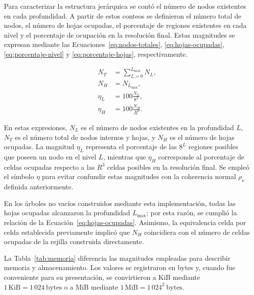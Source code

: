 Para caracterizar la estructura jerárquica se contó el número de nodos
existentes en cada profundidad. A partir de estos conteos se definieron
el número total de nodos, el número de hojas ocupadas, el porcentaje
de regiones existentes en cada nivel y el porcentaje de ocupación en
la resolución final. Estas magnitudes se expresan mediante las
Ecuaciones~\eqref{eq:nodos-totales},
\eqref{eq:hojas-ocupadas},
\eqref{eq:porcentaje-nivel} y
\eqref{eq:porcentaje-hojas}, respectivamente.

\begin{subequations}\label{eq:metricas-estructurales}
\begin{align}
N_T
&=
\sum_{L=0}^{L_{\max}}N_L,
\label{eq:nodos-totales}\\
N_H
&=
N_{L_{\max}},
\label{eq:hojas-ocupadas}\\
\eta_L
&=
100\frac{N_L}{8^L},
\label{eq:porcentaje-nivel}\\
\eta_H
&=
100\frac{N_H}{R^3}.
\label{eq:porcentaje-hojas}
\end{align}
\end{subequations}

En estas expresiones, $N_L$ es el número de nodos existentes en la
profundidad $L$, $N_T$ es el número total de nodos internos y hojas,
y $N_H$ es el número de hojas ocupadas. La magnitud $\eta_L$
representa el porcentaje de las $8^L$ regiones posibles que poseen un
nodo en el nivel $L$, mientras que $\eta_H$ corresponde al porcentaje
de celdas ocupadas respecto a las $R^3$ celdas posibles en la
resolución final. Se empleó el símbolo $\eta$ para evitar confundir
estas magnitudes con la coherencia normal $\rho_\nu$ definida
anteriormente.

En los árboles no vacíos construidos mediante esta implementación,
todas las hojas ocupadas alcanzaron la profundidad $L_{\max}$; por
esta razón, se cumplió la relación de la
Ecuación~\eqref{eq:hojas-ocupadas}. Asimismo, la equivalencia celda
por celda establecida previamente implicó que $N_H$ coincidiera con
el número de celdas ocupadas de la rejilla construida directamente.

La Tabla~\ref{tab:memoria} diferencia las magnitudes empleadas para describir memoria y almacenamiento. Los valores se registraron en bytes y, cuando fue conveniente para su presentación, se convirtieron a KiB mediante $1\,\text{KiB}=1\,024\ \text{bytes}$ o a MiB mediante $1\,\text{MiB}=1\,024^2\ \text{bytes}$.

